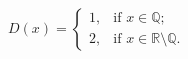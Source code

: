 \documentclass[nofonts]{ctexart}
\begin{document}
\begin{equation}
	D(x) = 
	\begin{cases}
		1, & \text{if } x \in \mathbb{Q};	\\
		2, & \text{if } x \in \mathbb{R} \setminus\mathbb{Q}.
	\end{cases}
\end{equation}
\end{document}

